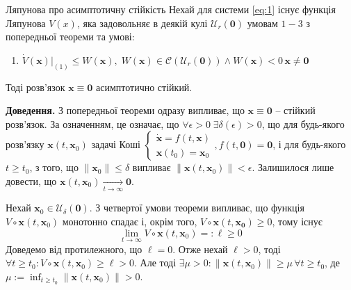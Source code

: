 \documentclass[14pt]{extarticle}
\begin{document}
\begin{theorem*}{Ляпунова про асимптотичну стійкість}
    Нехай для системи \ref{eq:1} існує функція Ляпунова $V(x)$, яка задовольняє в деякій кулі $\mathcal{U}_r(\mathbf{0})$ умовам $1-3$ з попередньої теореми та умові:
    \begin{enumerate}
        \item $\dot{V}(\mathbf{x})\Big|_{(1)} \leq W(\mathbf{x}), \; W(\mathbf{x}) \in \mathcal{C}(\mathcal{U}_r(\mathbf{0})) \wedge W(\mathbf{x}) < 0 \, \mathbf{x} \neq \mathbf{0}$
    \end{enumerate}
    Тоді розв'язок $\mathbf{x} \equiv \mathbf{0}$ асимптотично стійкий.
\end{theorem*}

\textbf{Доведення.} З попередньої теореми одразу випливає, що $\mathbf{x} \equiv \mathbf{0}$ -- стійкий розв'язок. За означенням, це означає, що $\forall \epsilon > 0 \; \exists \delta(\epsilon) > 0$, що для будь-якого розв'язку $\mathbf{x}(t,\mathbf{x}_0)$ задачі Коші $\begin{cases}
    \dot{\mathbf{x}} = f(t,\mathbf{x}) \\
    \mathbf{x}(t_0)=\mathbf{x}_0
\end{cases},f(t,\mathbf{0})=\mathbf{0}$, і для будь-якого $t \geq t_0$, з того, що $\|\mathbf{x}_0\| \leq \delta$ випливає $\|\mathbf{x}(t,\mathbf{x}_0)\| < \epsilon$. Залишилося лише довести, що $\mathbf{x}(t,\mathbf{x}_0) \xrightarrow[t \to \infty]{}\mathbf{0}$.

Нехай $\mathbf{x}_0 \in \mathcal{U}_{\delta}(\mathbf{0})$. З четвертої умови теореми випливає, що функція $V \circ \mathbf{x}(t,\mathbf{x}_0)$ монотонно спадає і, окрім того, $V \circ \mathbf{x}(t,\mathbf{x_0}) \geq 0$, тому існує
\[
\lim_{t \to \infty} V \circ \mathbf{x}(t,\mathbf{x}_0) =: \ell \geq 0
\]
Доведемо від протилежного, що $\ell=0$. Отже нехай $\ell>0$, тоді $\forall t \geq t_0: V \circ \mathbf{x}(t,\mathbf{x}_0) \geq \ell > 0$. Але тоді $\exists \mu > 0: \|\mathbf{x}(t,\mathbf{x}_0)\| \geq \mu \, \forall t \geq t_0$, де $\mu := \inf_{t \geq t_0}\|\mathbf{x}(t,\mathbf{x}_0)\| > 0$. 
\end{document}

